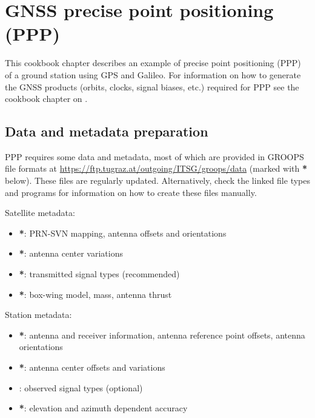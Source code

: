 \section{GNSS precise point positioning (PPP)}\label{cookbook.gnssPpp}

This cookbook chapter describes an example of precise point positioning (PPP) of a ground station using GPS and Galileo.
For information on how to generate the GNSS products (orbits, clocks, signal biases, etc.) required for PPP see the
cookbook chapter on .

\subsection{Data and metadata preparation}\label{cookbook.gnssPpp:metadata}

PPP requires some data and metadata, most of which are
provided in GROOPS file formats at \url{https://ftp.tugraz.at/outgoing/ITSG/groops/data}
(marked with \textbf{*} below). These files are regularly updated. Alternatively, check the linked
file types and programs for information on how to create these files manually.

Satellite metadata:
\begin{itemize}
  \item {}\textbf{*}: PRN-SVN mapping, antenna offsets and orientations
  \item {}\textbf{*}: antenna center variations
  \item {}\textbf{*}: transmitted signal types (recommended)
  \item {}\textbf{*}: box-wing model, mass, antenna thrust
\end{itemize}

Station metadata:
\begin{itemize}
  \item {}\textbf{*}: antenna and receiver information, antenna reference point
        offsets, antenna orientations
  \item {}\textbf{*}: antenna center offsets and variations
  \item {}: observed signal types (optional)
  \item {}\textbf{*}: elevation and azimuth dependent accuracy
\end{itemize}

